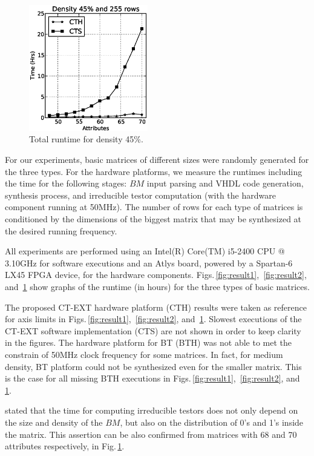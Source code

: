 \documentclass[authoryear,preprint,review,12pt]{elsarticle}
\begin{document}
\begin{figure}[htb]
    \begin{center}
        \includegraphics[height=5.5cm]{med48_density.eps}
    \end{center}
\caption{Total runtime for density 45\%.}
\label{fig:result3}
\end{figure}

For our experiments, basic matrices of different sizes were randomly generated for the three types. For the
hardware platforms, we measure the runtimes including the time for the following stages: $BM$ input parsing 
and VHDL code generation, synthesis process, and irreducible testor computation (with the hardware 
component running at 50MHz). The number of rows for each type of matrices is conditioned by the dimensions of 
the biggest matrix that may be synthesized at the desired running frequency.

All experiments are performed using an Intel(R) Core(TM) i5-2400 CPU @ 3.10GHz for software executions and 
an Atlys board, powered by a Spartan-6 LX45 FPGA device, for the hardware components.
Figs.\,\ref{fig:result1}, \,\ref{fig:result2}, and \,\ref{fig:result3} show graphs of the runtime (in hours) 
for the three types of basic matrices. 

The proposed CT-EXT hardware platform (CTH) results were taken as reference for axis limits in 
Figs.\,\ref{fig:result1}, \,\ref{fig:result2}, and \,\ref{fig:result3}.
Slowest executions of the CT-EXT software implementation (CTS) are not shown in order to keep clarity in 
the figures. 
The hardware platform for BT (BTH) was not able to met the constrain of 50MHz clock frequency for some 
matrices. In fact, for medium  density, BT platform could not be synthesized even for the smaller matrix. 
This is the case for all missing BTH executions in Figs.\,\ref{fig:result1}, \,\ref{fig:result2}, and \,\ref{fig:result3}.

\cite{R21} stated that the time for computing irreducible testors does not only depend on the size and 
density of the $BM$, but also on the distribution of 0's and 1's inside the matrix. This assertion can 
be also confirmed from matrices with 68 and 70 attributes respectively, in Fig.\,\ref{fig:result3}.
\end{document}
